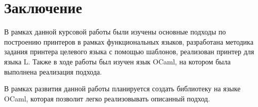 \section{Заключение}

В рамках данной курсовой работы были изучены основные подходы по построению принтеров в рамках функциональных языков, разработана методика задания принтера целевого языка с помощью шаблонов, реализован принтер для языка L. Также в ходе работы был изучен язык OCaml, на котором была выполнена реализация подхода.

В рамках развития данной работы планируется создать библиотеку на языке OCaml, которая позволит легко реализовывать описанный подход.